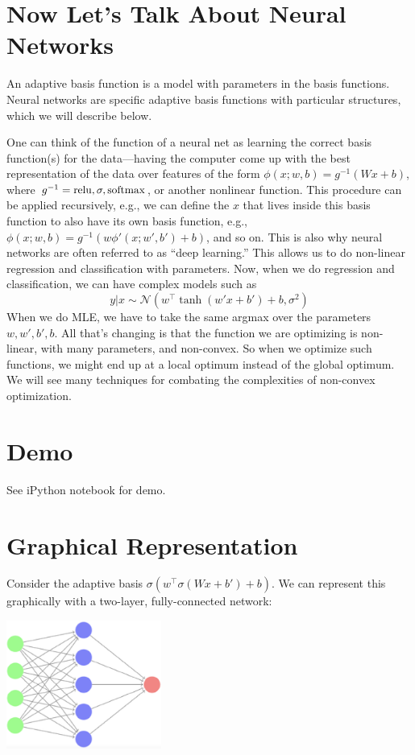 \documentclass{article}
\begin{document}
\section{Now Let's Talk About Neural Networks}

An adaptive basis function is a model with parameters in the basis functions. Neural networks are specific adaptive basis functions with particular structures, which we will describe below.

One can think of the function of a neural net as learning the correct basis function(s) for the data---having the computer come up with the best representation of the data over features of the form $\phi(x; w, b) = g^{-1}(Wx + b)$, where $g^{-1} = \operatorname{relu}, \sigma, \operatorname{softmax}$, or another nonlinear function. This procedure can be applied recursively, e.g., we can define the $x$ that lives inside this basis function to also have its own basis function, e.g., $\phi(x; w, b) = g^{-1}(w\phi'(x; w', b') + b)$, and so on. This is also why neural networks are often referred to as ``deep learning.'' This allows us to do non-linear regression and classification with parameters. Now, when we do regression and classification, we can have complex models such as
$$y | x \sim \mathcal{N}(w^\top\tanh(w'x + b') + b, \sigma^2)$$
When we do MLE, we have to take the same argmax over the parameters $w, w', b', b$. All that's changing is that the function we are optimizing is non-linear, with many parameters, and non-convex. So when we optimize such functions, we might end up at a local optimum instead of the global optimum. We will see many techniques for combating the complexities of non-convex optimization.

\section{Demo}

See iPython notebook for demo.

\section{Graphical Representation}

Consider the adaptive basis $\sigma(w^\top \sigma(Wx + b') + b)$. We can represent this graphically with a two-layer, fully-connected network:

\begin{center}
    \includegraphics[width=2in]{7/neural-network.png}
\end{center}
\end{document}
